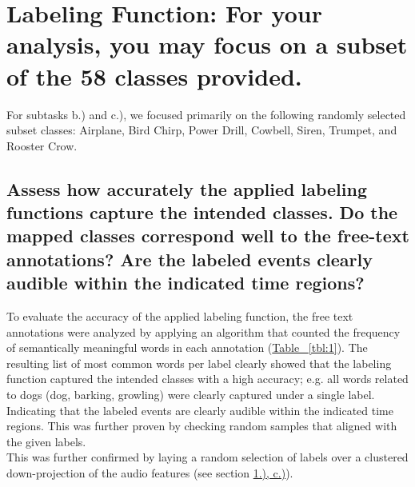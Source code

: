 
\section{Labeling Function: {\normalfont\normalsize For your analysis, you may focus on a subset of the 58 classes provided.}}
\label{sec:Labeling Function}

For subtasks b.) and c.), we focused primarily on the following randomly selected subset classes: Airplane, Bird Chirp, Power Drill, Cowbell, Siren, Trumpet, and Rooster Crow.

\subsection{Assess how accurately the applied labeling functions capture the intended classes. Do the mapped classes correspond well to the free-text annotations? Are the labeled events clearly audible within the indicated time regions?}
\label{sec:Labeling Function:a}
To evaluate the accuracy of the applied labeling function, the free text annotations were analyzed by applying an algorithm that counted the frequency of semantically meaningful words in each annotation (\hyperref[tbl:1]{Table ~\ref*{tbl:1}}).
The resulting list of most common words per label clearly showed that the labeling function captured the intended classes with a high accuracy; e.g. all words related to dogs (dog, barking, growling) were clearly captured under a single label. Indicating that the labeled events are clearly audible within the indicated time regions. This was further proven by checking random samples that aligned with the given labels. \\
This was further confirmed by laying a random selection of labels over a clustered down-projection of the audio features (see section \hyperref[sec:Labeling Function:c]{1.), c.)}).   




